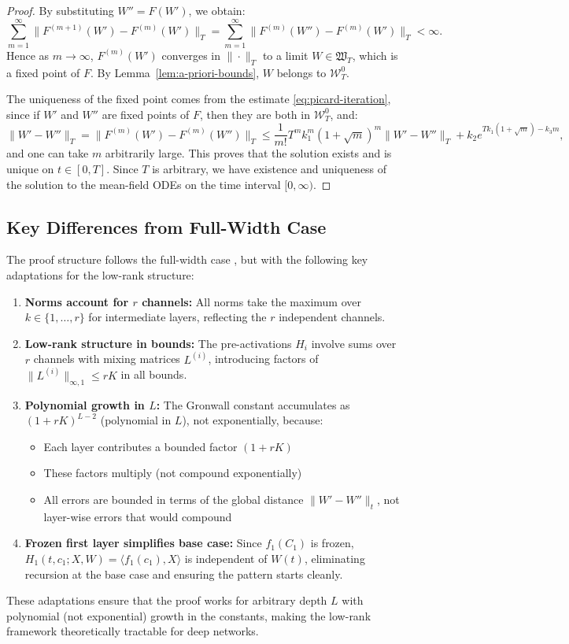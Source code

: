 \documentclass[11pt]{article}
\newcommand{\1}{\mathbbm{1}}
\begin{document}
\begin{proof}
By substituting $W''=F(W')$, we obtain:
\[
\sum_{m=1}^\infty \|F^{(m+1)}(W')-F^{(m)}(W')\|_T = \sum_{m=1}^\infty \|F^{(m)}(W'')-F^{(m)}(W')\|_T < \infty.
\]
Hence as $m\to\infty$, $F^{(m)}(W')$ converges in $\|\cdot\|_T$ to a limit $W\in\mathfrak{W}_T$, which is a fixed point of $F$. By Lemma~\ref{lem:a-priori-bounds}, $W$ belongs to $\mathcal{W}_T^0$.

The uniqueness of the fixed point comes from the estimate \eqref{eq:picard-iteration}, since if $W'$ and $W''$ are fixed points of $F$, then they are both in $\mathcal{W}_T^0$, and:
\[
\|W'-W''\|_T = \|F^{(m)}(W')-F^{(m)}(W'')\|_T \le \frac{1}{m!} T^m k_1^m (1+\sqrt{m})^m \|W'-W''\|_T + k_2 e^{T k_1(1+\sqrt{m}) - k_3 m},
\]
and one can take $m$ arbitrarily large. This proves that the solution exists and is unique on $t\in[0,T]$. Since $T$ is arbitrary, we have existence and uniqueness of the solution to the mean-field ODEs on the time interval $[0,\infty)$.
\end{proof}

\subsection{Key Differences from Full-Width Case}

The proof structure follows the full-width case \cite{nguyen2023rigorousframeworkmeanfield}, but with the following key adaptations for the low-rank structure:

\begin{enumerate}
\item \textbf{Norms account for $r$ channels:} All norms take the maximum over $k\in\{1,\ldots,r\}$ for intermediate layers, reflecting the $r$ independent channels.

\item \textbf{Low-rank structure in bounds:} The pre-activations $H_i$ involve sums over $r$ channels with mixing matrices $L^{(i)}$, introducing factors of $\|L^{(i)}\|_{\infty,1}\le rK$ in all bounds.

\item \textbf{Polynomial growth in $L$:} The Gronwall constant accumulates as $(1+rK)^{L-2}$ (polynomial in $L$), not exponentially, because:
\begin{itemize}
\item Each layer contributes a bounded factor $(1+rK)$
\item These factors multiply (not compound exponentially)
\item All errors are bounded in terms of the global distance $\|W'-W''\|_t$, not layer-wise errors that would compound
\end{itemize}

\item \textbf{Frozen first layer simplifies base case:} Since $f_1(C_1)$ is frozen, $H_1(t,c_1;X,W) = \langle f_1(c_1), X\rangle$ is independent of $W(t)$, eliminating recursion at the base case and ensuring the pattern starts cleanly.
\end{enumerate}

These adaptations ensure that the proof works for arbitrary depth $L$ with polynomial (not exponential) growth in the constants, making the low-rank framework theoretically tractable for deep networks.
\end{document}
